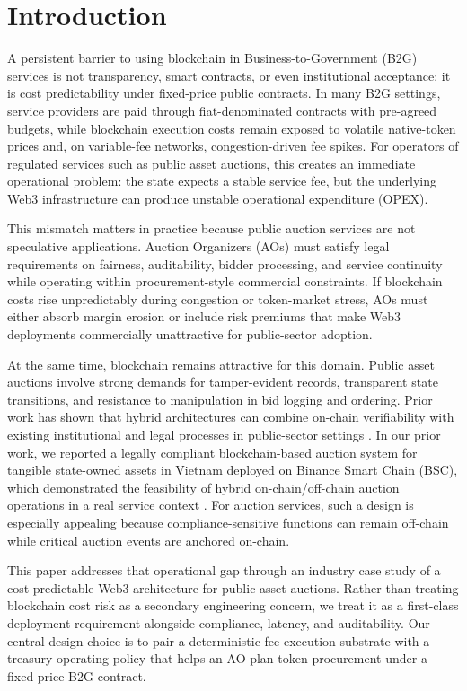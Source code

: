 \documentclass[runningheads]{llncs}
\begin{document}
\section{Introduction}

A persistent barrier to using blockchain in Business-to-Government (B2G) services is not transparency, smart contracts, or even institutional acceptance; it is cost predictability under fixed-price public contracts. In many B2G settings, service providers are paid through fiat-denominated contracts with pre-agreed budgets, while blockchain execution costs remain exposed to volatile native-token prices and, on variable-fee networks, congestion-driven fee spikes. For operators of regulated services such as public asset auctions, this creates an immediate operational problem: the state expects a stable service fee, but the underlying Web3 infrastructure can produce unstable operational expenditure (OPEX).

This mismatch matters in practice because public auction services are not speculative applications. Auction Organizers (AOs) must satisfy legal requirements on fairness, auditability, bidder processing, and service continuity while operating within procurement-style commercial constraints. If blockchain costs rise unpredictably during congestion or token-market stress, AOs must either absorb margin erosion or include risk premiums that make Web3 deployments commercially unattractive for public-sector adoption.

At the same time, blockchain remains attractive for this domain. Public asset auctions involve strong demands for tamper-evident records, transparent state transitions, and resistance to manipulation in bid logging and ordering. Prior work has shown that hybrid architectures can combine on-chain verifiability with existing institutional and legal processes in public-sector settings \cite{ref_Akaba2020,ref_Baranwal2020,ref_abdelsalam2025}. In our prior work, we reported a legally compliant blockchain-based auction system for tangible state-owned assets in Vietnam deployed on Binance Smart Chain (BSC), which demonstrated the feasibility of hybrid on-chain/off-chain auction operations in a real service context \cite{ref_Le2026DAS}. For auction services, such a design is especially appealing because compliance-sensitive functions can remain off-chain while critical auction events are anchored on-chain.

This paper addresses that operational gap through an industry case study of a cost-predictable Web3 architecture for public-asset auctions. Rather than treating blockchain cost risk as a secondary engineering concern, we treat it as a first-class deployment requirement alongside compliance, latency, and auditability. Our central design choice is to pair a deterministic-fee execution substrate with a treasury operating policy that helps an AO plan token procurement under a fixed-price B2G contract.
\end{document}
